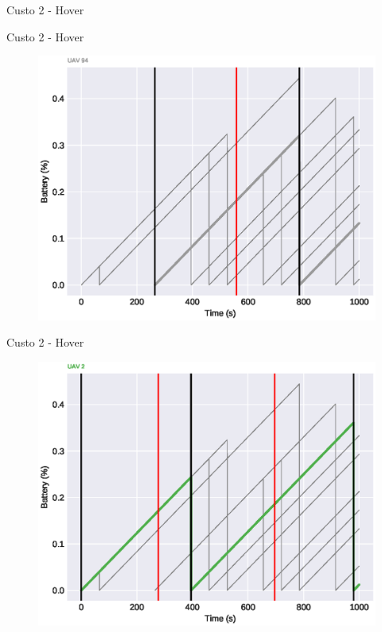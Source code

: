 \begin{frame}{Custo 2 - Hover}
            \end{frame}\begin{frame}{Custo 2 - Hover}
                \begin{figure}[!htb]
                     \includegraphics[width=\textwidth]{custo_2/uav_hover_acum_uav_8.eps}
                 \end{figure}
            \end{frame}\begin{frame}{Custo 2 - Hover}
                \begin{figure}[!htb]
                     \includegraphics[width=\textwidth]{custo_2/uav_hover_acum_uav_2.eps}

\end{figure}
\end{frame}
